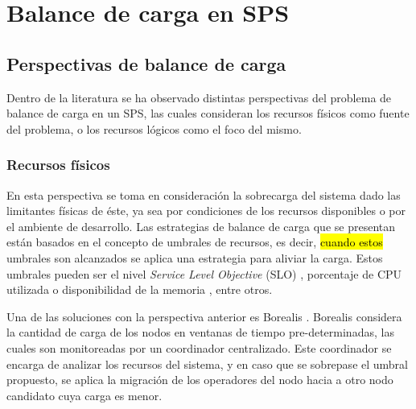 \chapter{Balance de carga en SPS}
\label{cap:estadoDelArte}

\section{Perspectivas de balance de carga}
\label{sec:perspectivasBC}
Dentro de la literatura se ha observado distintas perspectivas del problema de balance de carga en un SPS, las cuales consideran los recursos físicos como fuente del problema, o los recursos lógicos como el foco del mismo.

\subsection{Recursos físicos}
\label{subsec:recFisicosBC}
En esta perspectiva se toma en consideración la sobrecarga del sistema dado las limitantes físicas de éste, ya sea por condiciones de los recursos disponibles o por el ambiente de desarrollo. Las estrategias de balance de carga que se presentan están basados en el concepto de umbrales de recursos, es decir, \hl{cuando estos} umbrales son alcanzados se aplica una estrategia para aliviar la carga. Estos umbrales pueden ser el nivel \textit{Service Level Objective} (SLO) \citep{sturm2000foundations}, porcentaje de CPU utilizada o disponibilidad de la memoria \citep{Dong06schedulingalgorithms}, entre otros.

Una de las soluciones con la perspectiva anterior es Borealis \citep{XingZH05}. Borealis considera la cantidad de carga de los nodos en ventanas de tiempo pre-determinadas, las cuales son monitoreadas por un coordinador centralizado. Este coordinador se encarga de analizar los recursos del sistema, y en caso que se sobrepase el umbral propuesto, se aplica la migración de los operadores del nodo hacia a otro nodo candidato cuya carga es menor.


